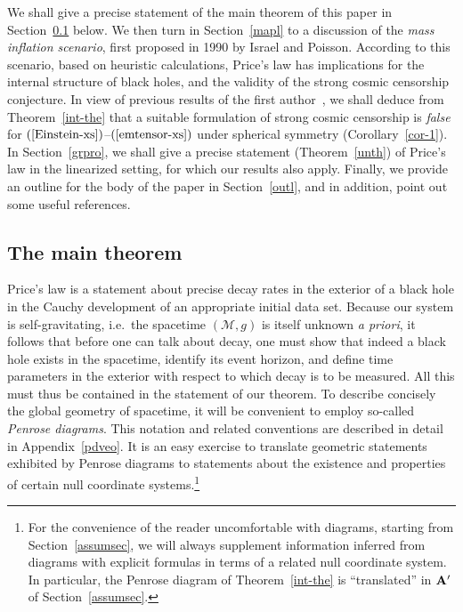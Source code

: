 \documentclass{article}
\begin{document}
We shall give a precise statement of the main theorem of this paper in Section~\ref{K9e} below.
We then  turn in Section~\ref{mapl} to a discussion 
of the \emph{mass inflation scenario},
first proposed in 1990 by Israel and Poisson. According to this scenario, based
on heuristic calculations, Price's law
has implications for the internal structure of black holes, and the
validity of the strong cosmic censorship conjecture.
In view of previous results of the first author~\cite{md:cbh}, we shall deduce from
Theorem~\ref{int-the} that a suitable formulation of
strong cosmic censorship is \emph{false} for $(\ref{Einstein-xs})$--$(\ref{emtensor-xs})$
under spherical symmetry (Corollary~\ref{cor-1}).  In Section~\ref{grpro}, we shall 
give a precise statement (Theorem~\ref{unth}) of Price's law in the linearized 
setting, for which our results also apply.
Finally, we provide an outline for the body of the paper in Section~\ref{outl}, and in addition,
point out some useful references.

\subsection{The main theorem}
\label{K9e}
Price's law is a statement about precise decay rates in the exterior of a black hole
in the Cauchy development of an appropriate initial data set. 
Because our system is self-gravitating, i.e.~the spacetime
$(\mathcal{M}, g)$ is itself unknown \emph{a priori}, 
it follows that before one can talk about decay, one must show that indeed 
a black hole exists in the spacetime, 
identify its event horizon, and define time parameters
in the exterior
with respect to which decay is to be measured. All this must thus be contained in
the statement of our theorem. 
To describe concisely the global geometry of spacetime, it will 
be convenient to employ so-called \emph{Penrose diagrams}. 
This notation and related conventions are described in detail in Appendix~\ref{pdveo}.
It is an easy exercise to translate geometric statements exhibited by 
Penrose diagrams
to statements about the existence and properties of certain null coordinate 
systems.\footnote{For the convenience of the reader uncomfortable with 
diagrams, starting from Section~\ref{assumsec}, we will 
always supplement information inferred from diagrams with explicit formulas in terms of a related null 
coordinate system. In particular,
the Penrose diagram of Theorem~\ref{int-the} is ``translated'' in 
${\bf A}'$ of Section~\ref{assumsec}.} 
\end{document}

